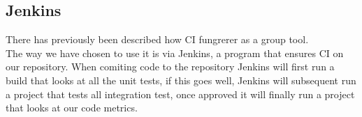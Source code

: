 	\subsection{Jenkins}
	There has previously been described how CI fungrerer as a group tool. \\
	The way we have chosen to use it is via Jenkins, a program that ensures CI on our repository. When comiting code to the repository  Jenkins will first run a build that looks at all the unit tests, if this goes well, Jenkins will subsequent run a project that tests all integration test, once approved it will finally run a project that looks at our code metrics.
	\clearpage